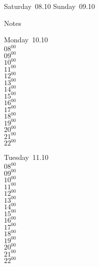 \documentclass[11pt,a4paper]{book}\usepackage[]{graphicx}\usepackage[]{color}
\begin{document}
\begin{weekendbox}
  Saturday~08.10
  \tcblower
  Sunday~09.10
\end{weekendbox} %
\begin{notebox}
  Notes
\end{notebox}
\clearpage
\begin{headerbox}
\end{headerbox}
\begin{weekdaybox}
  Monday~10.10\\
  { 
  \vfill
  $08^{00}$\\
$09^{00}$\\
$10^{00}$\\
$11^{00}$\\
$12^{00}$\\
$13^{00}$\\
$14^{00}$\\
$15^{00}$\\
$16^{00}$\\
$17^{00}$\\
$18^{00}$\\
$19^{00}$\\
$20^{00}$\\
$21^{00}$\\
$22^{00}$\\
  }
\end{weekdaybox}
\begin{weekdaybox}
  Tuesday~11.10\\
  { 
  \vfill
  $08^{00}$\\
$09^{00}$\\
$10^{00}$\\
$11^{00}$\\
$12^{00}$\\
$13^{00}$\\
$14^{00}$\\
$15^{00}$\\
$16^{00}$\\
$17^{00}$\\
$18^{00}$\\
$19^{00}$\\
$20^{00}$\\
$21^{00}$\\
$22^{00}$\\
  }
\end{weekdaybox}
\end{document}
